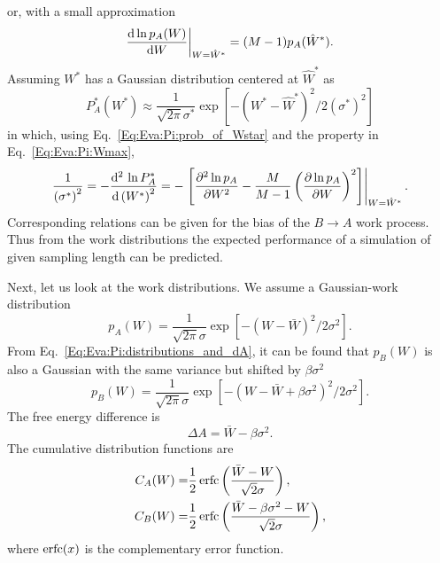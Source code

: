 or, with a small approximation
\begin{equation}
    \frac{\mathop{}\!\mathrm{d} \ln{p_A(W)}}{\mathop{}\!\mathrm{d} W}\biggr\rvert_{W=\hat{W}^\ast}=(M-1)p_A(\hat{W}^\ast).
    \label{Eq:Eva:Pi:Wmax2}
\end{equation}
Assuming $W^\ast$ has a Gaussian distribution centered at $\hat{W}^\ast$ as
\begin{equation}
    P_A^\ast(W^\ast)\approx \frac{1}{\sqrt{2\pi}\sigma^\ast}\exp{\left[-(W^\ast-\hat{W}^\ast)^2/2{\left(\sigma^\ast\right)}^2\right]}
\end{equation}
in which, using Eq.~\ref{Eq:Eva:Pi:prob_of_Wstar} and the property in Eq.~\ref{Eq:Eva:Pi:Wmax},
\begin{equation}
    \frac{1}{{\left(\sigma^\ast\right)}^2}=-\frac{\mathop{}\!\mathrm{d}^2\,\ln{P_A^\ast}}{\mathop{}\!\mathrm{d}\, {\left(W^\ast\right)}^2}=-\left.\left[\frac{\partial^2 \ln{p_A}}{\partial W^2}-\frac{M}{M-1}\left(\frac{\partial \ln p_A}{\partial W}\right)^2\right]\right\rvert_{W=\hat{W}^\ast}.
\end{equation}
Corresponding relations can be given for the bias of the $B\to A$ work process. Thus from the work distributions the expected performance of a simulation of given sampling length can be predicted.

Next, let us look at the work distributions. We assume a Gaussian-work distribution
\begin{equation}
    p_A(W)=\frac{1}{\sqrt{2\pi}\sigma}\exp{\left[-(W-\bar{W})^2/2\sigma^2\right]}.
    \label{Eq:Eva:Pi:pAW}
\end{equation}
From Eq.~\ref{Eq:Eva:Pi:distributions_and_dA}, it can be found that $p_B(W)$ is also a Gaussian with the same variance but shifted by $\beta\sigma^2$
\begin{equation}
    p_B(W)=\frac{1}{\sqrt{2\pi}\sigma}\exp{\left[-(W-\bar{W}+\beta\sigma^2)^2/2\sigma^2\right]}.
\end{equation}
The free energy difference is
\begin{equation}
    \Delta A=\bar{W}-\beta\sigma^2.
    \label{Eq:Eva:Pi:dA}
\end{equation}
The cumulative distribution functions are
\begin{align}
    C_A(W)=&\frac{1}{2} \operatorname{erfc} \left(\frac{\bar{W}-W}{\sqrt{2}\sigma}\right),\\
    C_B(W)=&\frac{1}{2} \operatorname{erfc}\left(\frac{\bar{W}-\beta\sigma^2-W}{\sqrt{2}\sigma}\right),
\end{align}
where $\operatorname{erfc}(x)$ is the complementary error function.

